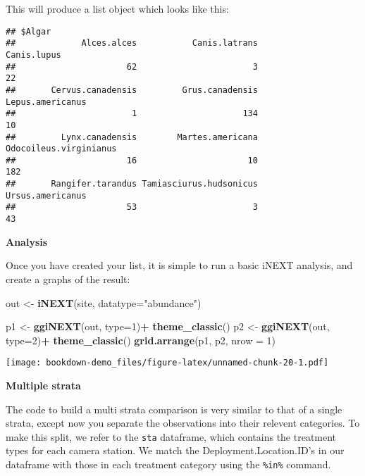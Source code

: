 \documentclass[]{book}
\newenvironment{Shaded}{\begin{snugshade}}{\end{snugshade}}
\newcommand{\KeywordTok}[1]{\textcolor[rgb]{0.13,0.29,0.53}{\textbf{#1}}}
\newcommand{\DataTypeTok}[1]{\textcolor[rgb]{0.13,0.29,0.53}{#1}}
\newcommand{\DecValTok}[1]{\textcolor[rgb]{0.00,0.00,0.81}{#1}}
\newcommand{\StringTok}[1]{\textcolor[rgb]{0.31,0.60,0.02}{#1}}
\newcommand{\OperatorTok}[1]{\textcolor[rgb]{0.81,0.36,0.00}{\textbf{#1}}}
\newcommand{\NormalTok}[1]{#1}
\begin{document}
This will produce a list object which looks like this:

\begin{verbatim}
## $Algar
##             Alces.alces           Canis.latrans             Canis.lupus 
##                      62                       3                      22 
##       Cervus.canadensis         Grus.canadensis        Lepus.americanus 
##                       1                     134                      10 
##         Lynx.canadensis        Martes.americana  Odocoileus.virginianus 
##                      16                      10                     182 
##       Rangifer.tarandus Tamiasciurus.hudsonicus        Ursus.americanus 
##                      53                       3                      43
\end{verbatim}

\textbf{Analysis}

Once you have created your list, it is simple to run a basic iNEXT
analysis, and create a graphs of the result:

\begin{Shaded}
\begin{Highlighting}[]
\NormalTok{out <-}\StringTok{ }\KeywordTok{iNEXT}\NormalTok{(site, }\DataTypeTok{datatype=}\StringTok{"abundance"}\NormalTok{)}
\end{Highlighting}
\end{Shaded}

\begin{Shaded}
\begin{Highlighting}[]
\NormalTok{p1 <-}\StringTok{ }\KeywordTok{ggiNEXT}\NormalTok{(out, }\DataTypeTok{type=}\DecValTok{1}\NormalTok{)}\OperatorTok{+}\StringTok{ }\KeywordTok{theme_classic}\NormalTok{() }
\NormalTok{p2 <-}\StringTok{ }\KeywordTok{ggiNEXT}\NormalTok{(out, }\DataTypeTok{type=}\DecValTok{2}\NormalTok{)}\OperatorTok{+}\StringTok{ }\KeywordTok{theme_classic}\NormalTok{() }
\KeywordTok{grid.arrange}\NormalTok{(p1, p2, }\DataTypeTok{nrow =} \DecValTok{1}\NormalTok{)}
\end{Highlighting}
\end{Shaded}

\texttt{[image: bookdown-demo\_files/figure-latex/unnamed-chunk-20-1.pdf]}

\textbf{Multiple strata}

The code to build a multi strata comparison is very similar to that of a
single strata, except now you separate the observations into their
relevent categories. To make this split, we refer to the \texttt{sta}
dataframe, which contains the treatment types for each camera station.
We match the Deployment.Location.ID's in our dataframe with those in
each treatment category using the \texttt{\%in\%} command.
\end{document}
